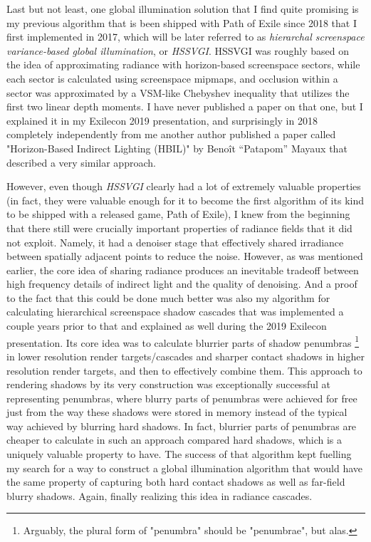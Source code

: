 \documentclass{jcgt}
\begin{document}
Last but not least, one global illumination solution that I find quite promising is my previous algorithm that is been shipped with Path of Exile since 2018 that I first implemented in 2017, which will be later referred to as \emph{hierarchal screenspace variance-based global illumination}, or \emph{HSSVGI}.
HSSVGI was roughly based on the idea of approximating radiance with horizon-based screenspace sectors, while each sector is calculated using screenspace mipmaps, and occlusion within a sector was approximated by a VSM-like Chebyshev inequality that utilizes the first two linear depth moments.
I have never published a paper on that one, but I explained it in my Exilecon 2019 presentation, and surprisingly in 2018 completely independently from me another author published a paper called
"Horizon-Based Indirect Lighting (HBIL)" by Benoît “Patapom” Mayaux that described a very similar approach.

However, even though \emph{HSSVGI} clearly had a lot of extremely valuable properties (in fact, they were valuable enough for it to become the first algorithm of its kind to be shipped
with a released game, Path of Exile), I knew from the beginning that there still were crucially important properties of radiance fields that it did not exploit. Namely, it had a denoiser stage that effectively shared irradiance between spatially adjacent points to reduce the noise. However, as was mentioned earlier, the core idea of sharing radiance produces an inevitable tradeoff between high frequency details of indirect light and the quality of denoising. And a proof to the fact that this could be done much better was also my algorithm for
calculating hierarchical screenspace shadow cascades that was implemented a couple years prior to that and explained as well during the 2019 Exilecon presentation. Its core idea was to calculate
blurrier parts of shadow penumbras \footnote{Arguably, the plural form of "penumbra" should be "penumbrae", but alas.} in lower resolution render targets/cascades and sharper contact shadows in higher resolution render targets, and then to effectively combine them. This
approach to rendering shadows by its very construction was exceptionally successful at representing penumbras, where blurry parts of penumbras were achieved for free just from the way these shadows were
stored in memory instead of the typical way achieved by blurring hard shadows. In fact, blurrier parts of penumbras are cheaper to calculate in such an approach compared hard shadows, which is a uniquely valuable property to have. The success of that algorithm kept fuelling my search for a way to construct a global illumination algorithm that would have the same property of capturing both
hard contact shadows as well as far-field blurry shadows. Again, finally realizing this idea in radiance cascades.
\end{document}

